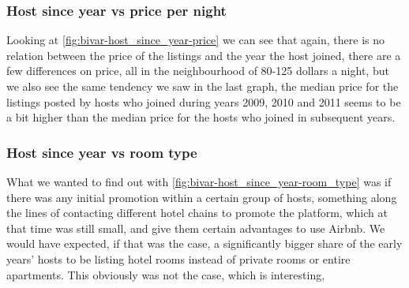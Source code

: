 \pagebreak
\subsubsection{Host since year vs price per night}


Looking at \cref{fig:bivar-host_since_year-price} we can see that again, there is no relation between the price of the listings and the year the host joined, there are a few differences on price, all in the neighbourhood of 80-125 dollars a night, but we also see the same tendency we saw in the last graph, the median price for the listings posted by hosts who joined during years 2009, 2010 and 2011 seems to be a bit higher than the median price for the hosts who joined in subsequent years.


\pagebreak

\subsubsection{Host since year vs room type}


What we wanted to find out with \cref{fig:bivar-host_since_year-room_type} was if there was any initial promotion within a certain group of hosts, something along the lines of contacting different hotel chains to promote the platform, which at that time was still small, and give them certain advantages to use Airbnb.
We would have expected, if that was the case, a significantly bigger share of the early years' hosts to be listing hotel rooms instead of private rooms or entire apartments. 
This obviously was not the case, which is interesting,


\pagebreak

\label{sub:bivariate_analysis}


